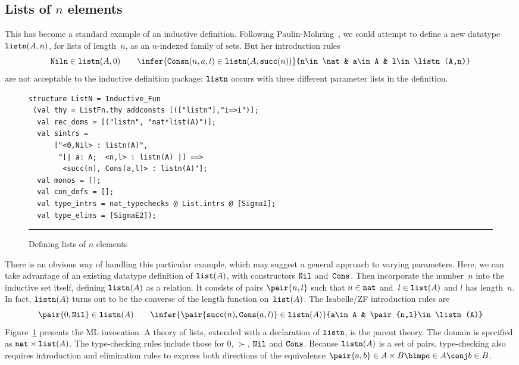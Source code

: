 \subsection{Lists of $n$ elements}\label{listn-sec}
This has become a standard example of an inductive definition.  Following
Paulin-Mohring~\cite{paulin92}, we could attempt to define a new datatype
${\tt listn}(A,n)$, for lists of length~$n$, as an $n$-indexed family of sets.
But her introduction rules
\[ {\tt Niln}\in\listn(A,0)  \qquad
   \infer{{\tt Consn}(n,a,l)\in\listn(A,\succ(n))}
         {n\in\nat & a\in A & l\in\listn(A,n)}
\]
are not acceptable to the inductive definition package:
${\tt listn}$ occurs with three different parameter lists in the definition.

\begin{figure}
\begin{small}
\begin{verbatim}
structure ListN = Inductive_Fun
 (val thy = ListFn.thy addconsts [(["listn"],"i=>i")];
  val rec_doms = [("listn", "nat*list(A)")];
  val sintrs = 
      ["<0,Nil> : listn(A)",
       "[| a: A;  <n,l> : listn(A) |] ==> 
        <succ(n), Cons(a,l)> : listn(A)"];
  val monos = [];
  val con_defs = [];
  val type_intrs = nat_typechecks @ List.intrs @ [SigmaI];
  val type_elims = [SigmaE2]);
\end{verbatim}
\end{small}
\hrule
\caption{Defining lists of $n$ elements} \label{listn-fig}
\end{figure} 

There is an obvious way of handling this particular example, which may suggest
a general approach to varying parameters.  Here, we can take advantage of an
existing datatype definition of ${\tt list}(A)$, with constructors ${\tt Nil}$
and~${\tt Cons}$.  Then incorporate the number~$n$ into the inductive set itself,
defining ${\tt listn}(A)$ as a relation.  It consists of pairs $\pair{n,l}$ such
that $n\in{\tt nat}$ and~$l\in{\tt list}(A)$ and $l$ has length~$n$.  In fact,
${\tt listn}(A)$ turns out to be the converse of the length function on~${\tt list}(A)$. 
The Isabelle/ZF introduction rules are
\[ \pair{0,\Nil}\in\listn(A)  \qquad
   \infer{\pair{\succ(n),\Cons(a,l)}\in\listn(A)}
         {a\in A & \pair{n,l}\in\listn(A)}
\]
Figure~\ref{listn-fig} presents the ML invocation.  A theory of lists,
extended with a declaration of ${\tt listn}$, is the parent theory.  The domain
is specified as ${\tt nat}\times{\tt list}(A)$.  The type-checking rules include those
for 0, $\succ$, ${\tt Nil}$ and ${\tt Cons}$.  Because ${\tt listn}(A)$ is a set of pairs,
type-checking also requires introduction and elimination rules to express
both directions of the equivalence $\pair{a,b}\in A\times B \bimp a\in A
\conj b\in B$. 

